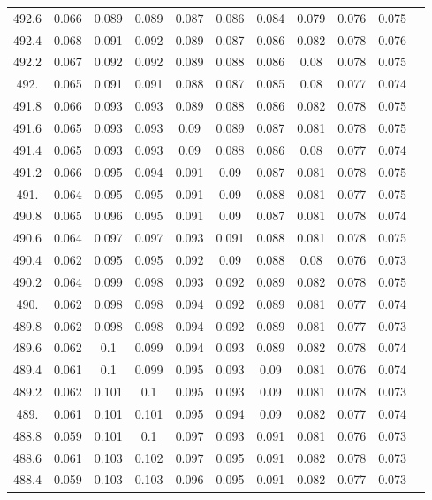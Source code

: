 \documentclass[12pt]{ctexart}
\numberwithin{equation}{section}
\begin{document}
\begin{longtable}{ccccccccccc}
492.6	&	0.066	&	0.089	&	0.089	&	0.087	&	0.086	&	0.084	&	0.079	&	0.076	&	0.075	\\
492.4	&	0.068	&	0.091	&	0.092	&	0.089	&	0.087	&	0.086	&	0.082	&	0.078	&	0.076	\\
492.2	&	0.067	&	0.092	&	0.092	&	0.089	&	0.088	&	0.086	&	0.08	&	0.078	&	0.075	\\
492.	&	0.065	&	0.091	&	0.091	&	0.088	&	0.087	&	0.085	&	0.08	&	0.077	&	0.074	\\
491.8	&	0.066	&	0.093	&	0.093	&	0.089	&	0.088	&	0.086	&	0.082	&	0.078	&	0.075	\\
491.6	&	0.065	&	0.093	&	0.093	&	0.09	&	0.089	&	0.087	&	0.081	&	0.078	&	0.075	\\
491.4	&	0.065	&	0.093	&	0.093	&	0.09	&	0.088	&	0.086	&	0.08	&	0.077	&	0.074	\\
491.2	&	0.066	&	0.095	&	0.094	&	0.091	&	0.09	&	0.087	&	0.081	&	0.078	&	0.075	\\
491.	&	0.064	&	0.095	&	0.095	&	0.091	&	0.09	&	0.088	&	0.081	&	0.077	&	0.075	\\
490.8	&	0.065	&	0.096	&	0.095	&	0.091	&	0.09	&	0.087	&	0.081	&	0.078	&	0.074	\\
490.6	&	0.064	&	0.097	&	0.097	&	0.093	&	0.091	&	0.088	&	0.081	&	0.078	&	0.075	\\
490.4	&	0.062	&	0.095	&	0.095	&	0.092	&	0.09	&	0.088	&	0.08	&	0.076	&	0.073	\\
490.2	&	0.064	&	0.099	&	0.098	&	0.093	&	0.092	&	0.089	&	0.082	&	0.078	&	0.075	\\
490.	&	0.062	&	0.098	&	0.098	&	0.094	&	0.092	&	0.089	&	0.081	&	0.077	&	0.074	\\
489.8	&	0.062	&	0.098	&	0.098	&	0.094	&	0.092	&	0.089	&	0.081	&	0.077	&	0.073	\\
489.6	&	0.062	&	0.1	&	0.099	&	0.094	&	0.093	&	0.089	&	0.082	&	0.078	&	0.074	\\
489.4	&	0.061	&	0.1	&	0.099	&	0.095	&	0.093	&	0.09	&	0.081	&	0.076	&	0.074	\\
489.2	&	0.062	&	0.101	&	0.1	&	0.095	&	0.093	&	0.09	&	0.081	&	0.078	&	0.073	\\
489.	&	0.061	&	0.101	&	0.101	&	0.095	&	0.094	&	0.09	&	0.082	&	0.077	&	0.074	\\
488.8	&	0.059	&	0.101	&	0.1	&	0.097	&	0.093	&	0.091	&	0.081	&	0.076	&	0.073	\\
488.6	&	0.061	&	0.103	&	0.102	&	0.097	&	0.095	&	0.091	&	0.082	&	0.078	&	0.073	\\
488.4	&	0.059	&	0.103	&	0.103	&	0.096	&	0.095	&	0.091	&	0.082	&	0.077	&	0.073	\\

\end{longtable}
\end{document}

